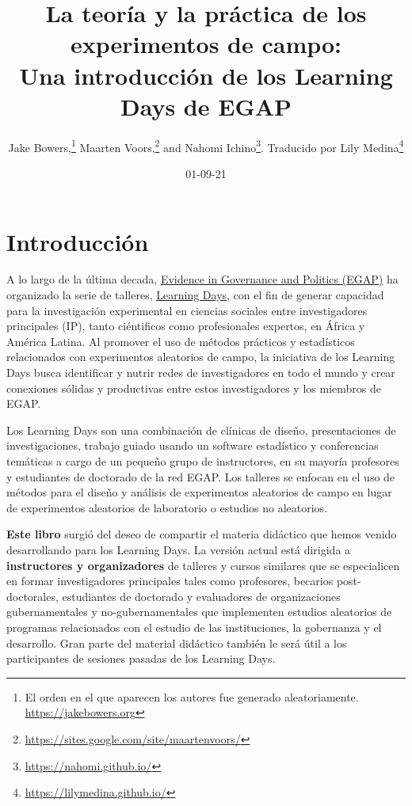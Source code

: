 \documentclass[
  12pt,
  spanish,
]{book}
\title{La teoría y la práctica de los experimentos de campo:\\
Una introducción de los Learning Days de EGAP}
\author{Jake Bowers,\footnote{El orden en el que aparecen los autores fue generado aleatoriamente. \url{https://jakebowers.org}} Maarten Voors,\footnote{\url{https://sites.google.com/site/maartenvoors/}} and Nahomi Ichino\footnote{\url{https://nahomi.github.io/}}. Traducido por Lily Medina\footnote{\url{https://lilymedina.github.io/}}}
\date{01-09-21}
\begin{document}
\maketitle

\captionsetup[table]{list=no}
\captionsetup[figure]{list=no}

{
\hypersetup{linkcolor=}
\setcounter{tocdepth}{1}
\tableofcontents
}
\hypertarget{introducciuxf3n}{%
\chapter{Introducción}\label{introducciuxf3n}}

A lo largo de la última decada, \href{http://egap.org/}{Evidence in Governance and Politics (EGAP)} ha organizado la serie de talleres, \href{https://egap.org/learning-days/}{Learning Days}, con el fin de generar capacidad para la investigación experimental en ciencias sociales entre investigadores principales (IP), tanto ciéntificos como profesionales expertos, en África y América Latina. Al promover el uso de métodos prácticos y estadísticos relacionados con experimentos aleatorios de campo, la iniciativa de los Learning Days busca identificar y nutrir redes de investigadores en todo el mundo y crear conexiones sólidas y productivas entre estos investigadores y los miembros de EGAP.

Los Learning Days son una combinación de clínicas de diseño, presentaciones de investigaciones, trabajo guiado usando un software estadístico y conferencias temáticas a cargo de un pequeño grupo de instructores, en su mayoría profesores y estudiantes de doctorado de la red EGAP. Los talleres se enfocan en el uso de métodos para el diseño y análisis de experimentos aleatorios de campo en lugar de experimentos aleatorios de laboratorio o estudios no aleatorios.

\textbf{Este libro} surgió del deseo de compartir el materia didáctico que hemos venido desarrollando para los Learning Days. La versión actual está dirigida a \textbf{instructores y organizadores} de talleres y cursos similares que se especialicen en formar investigadores principales tales como profesores, becarios post-doctorales, estudiantes de doctorado y evaluadores de organizaciones gubernamentales y no-gubernamentales que implementen estudios aleatorios de programas relacionados con el estudio de las instituciones, la gobernanza y el desarrollo. Gran parte del material didáctico también le será útil a los participantes de sesiones pasadas de los Learning Days.
\end{document}
